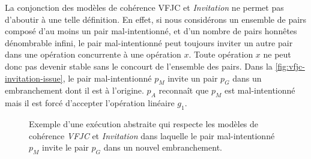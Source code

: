 La conjonction des modèles de cohérence \acs{VFJC} et \emph{Invitation} ne permet pas d'aboutir à une telle définition.
En effet, si nous considérons un ensemble de pairs composé d'au moins un pair mal-intentionné, et d'un nombre de pairs honnêtes dénombrable infini, le pair mal-intentionné peut toujours inviter un autre pair dans une opération concurrente à une opération $x$.
Toute opération $x$ ne peut donc pas devenir stable sans le concourt de l'ensemble des pairs.
Dans la \autoref{fig:vfjc-invitation-issue}, le pair mal-intentionné $p_M$ invite un pair $p_G$ dans un embranchement dont il est à l'origine.
$p_A$ reconnaît que $p_M$ est mal-intentionné mais il est forcé d'accepter l'opération linéaire $g_1$.

\begin{figure}[htb]
\centering
{}
\caption{Exemple  d'une exécution abstraite qui respecte les modèles de cohérence \emph{VFJC} et \emph{Invitation} dans laquelle le pair mal-intentionné $p_M$ invite le pair $p_G$ dans un nouvel embranchement.}
\label{fig:vfjc-invitation-issue}
\end{figure}


